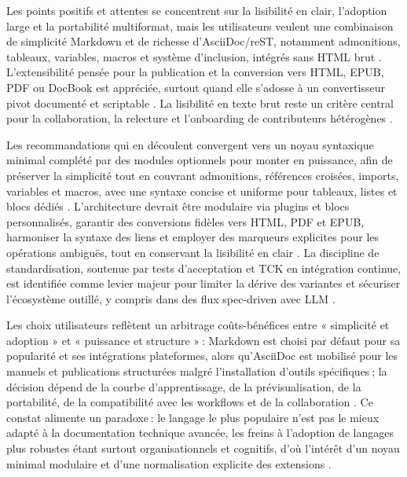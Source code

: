 \documentclass[a4paper,12pt]{article}
\begin{document}
Les points positifs et attentes se concentrent sur la lisibilité en clair, l’adoption large et la portabilité multiformat, mais les utilisateurs veulent une combinaison de simplicité Markdown et de richesse d’AsciiDoc/reST, notamment admonitions, tableaux, variables, macros et système d’inclusion, intégrés sans HTML brut \autocite{allenAsciiDocSyntaxQuick,allenAsciiDocWritersGuide,donathAdmonitionsMaterialMkDocs,fletchert.penneyMultiMarkdownUsersGuide2023}. L’extensibilité pensée pour la publication et la conversion vers HTML, EPUB, PDF ou DocBook est appréciée, surtout quand elle s’adosse à un convertisseur pivot documenté et scriptable \autocite{goodgerReStructuredTextMarkupSpecification2025,johnmacfarlanePandocUsersGuide2025,massimilianodominiciOverviewPandoc2014}. La lisibilité en texte brut reste un critère central pour la collaboration, la relecture et l’onboarding de contributeurs hétérogènes \autocite{allenAsciiDocWritersGuide,johnmacfarlaneCommonMarkSpec2024}.

Les recommandations qui en découlent convergent vers un noyau syntaxique minimal complété par des modules optionnels pour monter en puissance, afin de préserver la simplicité tout en couvrant admonitions, références croisées, imports, variables et macros, avec une syntaxe concise et uniforme pour tableaux, listes et blocs dédiés \autocite{allenAsciiDocSyntaxQuick,donathAdmonitionsMaterialMkDocs,fletchert.penneyMultiMarkdownUsersGuide2023,goodgerReStructuredTextMarkupSpecification2025}. L’architecture devrait être modulaire via plugins et blocs personnalisés, garantir des conversions fidèles vers HTML, PDF et EPUB, harmoniser la syntaxe des liens et employer des marqueurs explicites pour les opérations ambiguës, tout en conservant la lisibilité en clair \autocite{johnmacfarlanePandocUsersGuide2025,GitHubFlavoredMarkdown2019,johnmacfarlaneCommonMarkSpec2024}. La discipline de standardisation, soutenue par tests d’acceptation et TCK en intégration continue, est identifiée comme levier majeur pour limiter la dérive des variantes et sécuriser l’écosystème outillé, y compris dans des flux spec-driven avec LLM \autocite{EclipseProjectsAsciiDoc2025,GithubSpeckit2025,junghansGrammarStandardizedWiki2008}.

Les choix utilisateurs reflètent un arbitrage coûts-bénéfices entre « simplicité et adoption » et « puissance et structure » : Markdown est choisi par défaut pour sa popularité et ses intégrations plateformes, alors qu’AsciiDoc est mobilisé pour les manuels et publications structurées malgré l’installation d’outils spécifiques ; la décision dépend de la courbe d’apprentissage, de la prévisualisation, de la portabilité, de la compatibilité avec les workflows et de la collaboration \autocite{liuHowReadMeFiles2022,allenAsciiDocWritersGuide,markushofbauerLargeScaleCollaborativeWriting2023}. Ce constat alimente un paradoxe : le langage le plus populaire n’est pas le mieux adapté à la documentation technique avancée, les freins à l’adoption de langages plus robustes étant surtout organisationnels et cognitifs, d’où l’intérêt d’un noyau minimal modulaire et d’une normalisation explicite des extensions \autocite{johnmacfarlaneCommonMarkSpec2024,GitHubFlavoredMarkdown2019,goodgerReStructuredTextMarkupSpecification2025}.
\end{document}
